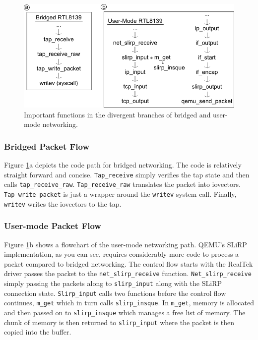 \begin{figure}[!ht]
	\centering
		\includegraphics[scale=0.6]{codepath2_alt}
	\caption{Important functions in the divergent branches of bridged and user-mode networking.}
	\label{fig:codepath2}
\end{figure}
\subsubsection{Bridged Packet Flow}
Figure \ref{fig:codepath2}a depicts the code path for bridged networking.
The code is relatively straight forward and concise.
\texttt{Tap\_receive} simply verifies the tap state and then calls \texttt{tap\_receive\_raw}.
\texttt{Tap\_receive\_raw} translates the packet into iovectors.
\texttt{Tap\_write\_packet} is just a wrapper around the \texttt{writev} system call.
Finally, \texttt{writev} writes the iovectors to the tap.

\subsubsection{User-mode Packet Flow}

Figure \ref{fig:codepath2}b shows a flowchart of the user-mode networking path.
QEMU's SLiRP implementation, as you can see, requires considerably more code to process a packet compared to bridged networking.
The control flow starts with the RealTek driver passes the packet to the \texttt{net\_slirp\_receive} function.
\texttt{Net\_slirp\_receive} simply passing the packets along to \texttt{slirp\_input} along with the SLiRP connection state.
\texttt{Slirp\_input} calls two functions before the control flow continues, \texttt{m\_get} which in turn calls \texttt{slirp\_insque}.
In \texttt{m\_get}, memory is allocated and then passed on to \texttt{slirp\_insque} which manages a free list of memory.
The chunk of memory is then returned to \texttt{slirp\_input} where the packet is then copied into the buffer.

